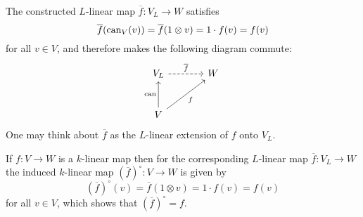 \begin{fluff}
%       
  The constructed $L$-linear map $\overline{f} \colon V_L \to W$ satisfies
  \[
      \overline{f}(\operatorname{can}_V(v))
    = \overline{f}(1 \otimes v)
    = 1 \cdot f(v)
    = f(v)
  \]
  for all $v \in V$, and therefore makes the following diagram commute:
    \[
      \begin{tikzcd}[sep = large]
          V_L
          \arrow[dashed]{r}[above]{\overline{f}}
        & W
        \\
          V
          \arrow{u}[left]{\can}
          \arrow{ru}[below right]{f}
        & {}
      \end{tikzcd}
    \]
  One may think about $\overline{f}$ as the $L$-linear extension of $f$ onto $V_L$.
  
  If $f \colon V \to W$ is a $k$-linear map then for the corresponding $L$-linear map $\overline{f} \colon V_L \to W$ the induced $k$-linear map $(\overline{f})^\circ \colon V \to W$ is given by
  \[
      (\overline{f})^\circ(v)
    = \overline{f}(1 \otimes v)
    = 1 \cdot f(v)
    = f(v)
  \]
  for all $v \in V$, which shows that $(\overline{f})^\circ = f$.
  

\end{fluff}
